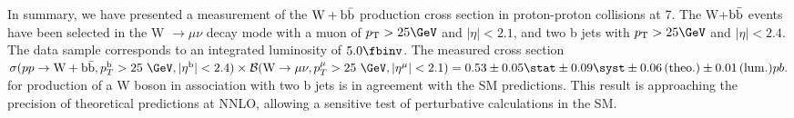 

In summary, we have presented a measurement of the $\mathrm{W+\mathrm{b\bar{b}}}$ production
cross section in proton-proton collisions at 7\TeV. The W+$\mathrm{b\bar{b}}$ events
have been  selected in the W $\to \mu\nu$ decay mode with a 
muon of $\pt>25\GeV$ and $|\eta|<2.1$, and two b jets with $\pt>25\GeV$ and $|\eta|<2.4$. 
The data sample corresponds to an integrated luminosity of $5.0\fbinv$.
The measured cross section 
$\sigma(pp\rightarrow \mathrm{W} + \bbbar, p_T^{\mathrm{b}}>25~\GeV, |\eta^{\mathrm{b}}|<2.4)\times {\cal{B}}(\Wmn, p_T^{\mu}>25~\GeV, |\eta^{\mu}|<2.1) =0.53\pm  0.05\stat \pm 0.09 \syst \pm 0.06 \theo \pm 0.01\lumi pb.$
for production of a W boson in association with two b jets is in agreement with
the SM predictions.
This result is approaching the precision of theoretical predictions at NNLO, 
allowing a sensitive test of perturbative calculations
in the SM.


